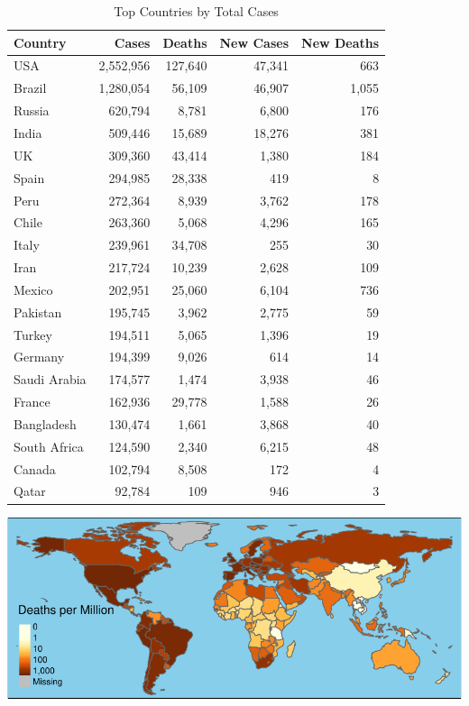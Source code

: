 \documentclass[]{article}
\begin{document}
\newpage

\begin{table}[!h]

\caption{\label{tab:unnamed-chunk-3}Top Countries by Total Cases}
\centering
\begin{tabular}{l|r|r|r|r}
\hline
Country & Cases & Deaths & New Cases & New Deaths\\
\hline
USA & 2,552,956 & 127,640 & 47,341 & 663\\
\hline
Brazil & 1,280,054 & 56,109 & 46,907 & 1,055\\
\hline
Russia & 620,794 & 8,781 & 6,800 & 176\\
\hline
India & 509,446 & 15,689 & 18,276 & 381\\
\hline
UK & 309,360 & 43,414 & 1,380 & 184\\
\hline
Spain & 294,985 & 28,338 & 419 & 8\\
\hline
Peru & 272,364 & 8,939 & 3,762 & 178\\
\hline
Chile & 263,360 & 5,068 & 4,296 & 165\\
\hline
Italy & 239,961 & 34,708 & 255 & 30\\
\hline
Iran & 217,724 & 10,239 & 2,628 & 109\\
\hline
Mexico & 202,951 & 25,060 & 6,104 & 736\\
\hline
Pakistan & 195,745 & 3,962 & 2,775 & 59\\
\hline
Turkey & 194,511 & 5,065 & 1,396 & 19\\
\hline
Germany & 194,399 & 9,026 & 614 & 14\\
\hline
Saudi Arabia & 174,577 & 1,474 & 3,938 & 46\\
\hline
France & 162,936 & 29,778 & 1,588 & 26\\
\hline
Bangladesh & 130,474 & 1,661 & 3,868 & 40\\
\hline
South Africa & 124,590 & 2,340 & 6,215 & 48\\
\hline
Canada & 102,794 & 8,508 & 172 & 4\\
\hline
Qatar & 92,784 & 109 & 946 & 3\\
\hline
\end{tabular}
\end{table}

\newpage

\includegraphics{covid_files/figure-latex/unnamed-chunk-4-1.pdf}
\end{document}
